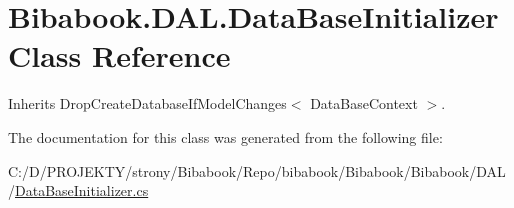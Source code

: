 \hypertarget{class_bibabook_1_1_d_a_l_1_1_data_base_initializer}{}\section{Bibabook.\+D\+A\+L.\+Data\+Base\+Initializer Class Reference}
\label{class_bibabook_1_1_d_a_l_1_1_data_base_initializer}


Inherits Drop\+Create\+Database\+If\+Model\+Changes$<$ Data\+Base\+Context $>$.



The documentation for this class was generated from the following file\+:\begin{DoxyCompactItemize}
\item 
C\+:/\+D/\+P\+R\+O\+J\+E\+K\+T\+Y/strony/\+Bibabook/\+Repo/bibabook/\+Bibabook/\+Bibabook/\+D\+A\+L/\hyperlink{_data_base_initializer_8cs}{Data\+Base\+Initializer.\+cs}\end{DoxyCompactItemize}

